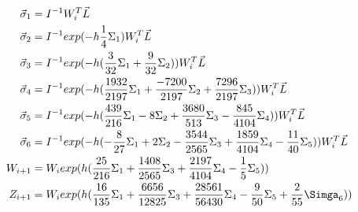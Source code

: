 \begin{equation}
\begin{aligned}
    \Vec{\sigma}_1 &= I^{-1}W^T_i\Vec{L}\\
    \Vec{\sigma}_2 &= I^{-1}exp(-h\frac{1}{4}\Sigma_1)W^T_i\Vec{L}\\
    \Vec{\sigma}_3 &= I^{-1}exp(-h(\frac{3}{32}\Sigma_1 + \frac{9}{32}\Sigma_2))W^T_i\Vec{L}\\
    \Vec{\sigma}_4 &= I^{-1}exp(-h(\frac{1932}{2197}\Sigma_1 +\frac{-7200}{2197}\Sigma_2+\frac{7296}{2197}\Sigma_3))W^T_i\Vec{L}\\
    \Vec{\sigma}_5 &= I^{-1}exp(-h(\frac{439}{216}\Sigma_1-8\Sigma_2+\frac{3680}{513}\Sigma_3-\frac{845}{4104}\Sigma_4))W^T_i\Vec{L}\\
    \Vec{\sigma}_6 &= I^{-1}exp(-h(-\frac{8}{27}\Sigma_1+2\Sigma_2-\frac{3544}{2565}\Sigma_3+\frac{1859}{4104}\Sigma_4-\frac{11}{40}\Sigma_5))W^T_i\Vec{L}\\
    W_{i+1} &= W_iexp(h(\frac{25}{216}\Sigma_1+\frac{1408}{2565}\Sigma_3+\frac{2197}{4104}\Sigma_4-\frac{1}{5}\Sigma_5))\\
    Z_{i+1} &= W_iexp(h(\frac{16}{135}\Sigma_1+\frac{6656}{12825}\Sigma_3+\frac{28561}{56430}\Sigma_4-\frac{9}{50}\Sigma_5+\frac{2}{55}\Simga_6))\\
   
\end{aligned}
\end{equation}
